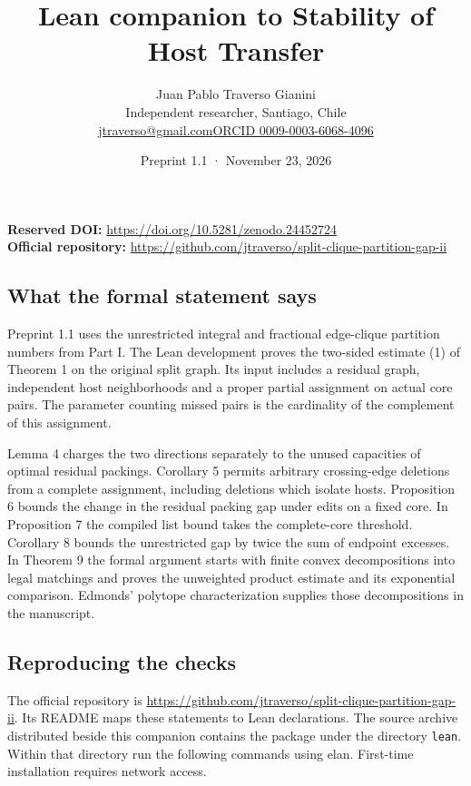 \documentclass[english,10pt,a4paper]{article}
\title{Lean companion to Stability of Host Transfer}
\author{Juan Pablo Traverso Gianini\\\small Independent researcher, Santiago, Chile\\\small\href{mailto:jtraverso@gmail.com}{jtraverso@gmail.com}\quad\href{https://orcid.org/0009-0003-6068-4096}{ORCID 0009-0003-6068-4096}}
\date{Preprint 1.1 \enspace · \enspace November 23, 2026}
\begin{document}
\raggedbottom\maketitle\vspace{-1.5em}
\noindent\textbf{Reserved DOI:} \url{https://doi.org/10.5281/zenodo.24452724}\\
\textbf{Official repository:} \url{https://github.com/jtraverso/split-clique-partition-gap-ii}
\subsection{What the formal statement says}\label{what-the-formal-statement-says}

Preprint 1.1 uses the unrestricted integral and fractional edge-clique partition numbers from Part I. The Lean development proves the two-sided estimate (1) of Theorem 1 on the original split graph. Its input includes a residual graph, independent host neighborhoods and a proper partial assignment on actual core pairs. The parameter counting missed pairs is the cardinality of the complement of this assignment.

Lemma 4 charges the two directions separately to the unused capacities of optimal residual packings. Corollary 5 permits arbitrary crossing-edge deletions from a complete assignment, including deletions which isolate hosts. Proposition 6 bounds the change in the residual packing gap under edits on a fixed core. In Proposition 7 the compiled list bound takes the complete-core threshold. Corollary 8 bounds the unrestricted gap by twice the sum of endpoint excesses. In Theorem 9 the formal argument starts with finite convex decompositions into legal matchings and proves the unweighted product estimate and its exponential comparison. Edmonds' polytope characterization supplies those decompositions in the manuscript.

\subsection{Reproducing the checks}\label{reproducing-the-checks}

The official repository is \url{https://github.com/jtraverso/split-clique-partition-gap-ii}. Its README maps these statements to Lean declarations. The source archive distributed beside this companion contains the package under the directory \texttt{lean}. Within that directory run the following commands using elan. First-time installation requires network access.
\end{document}
